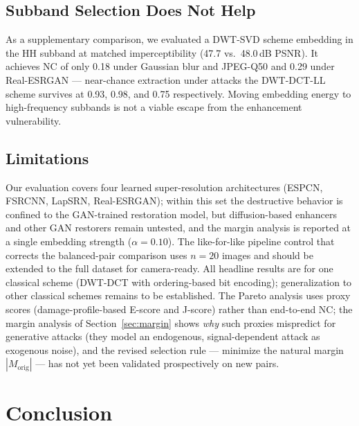 \documentclass[conference]{IEEEtran}
\begin{document}
\subsection{Subband Selection Does Not Help}
As a supplementary comparison, we evaluated a DWT-SVD scheme embedding
in the HH subband at matched imperceptibility (47.7 vs.\ 48.0\,dB
PSNR). It achieves NC of only 0.18 under Gaussian blur and JPEG-Q50 and
0.29 under Real-ESRGAN --- near-chance extraction under attacks
the DWT-DCT-LL scheme survives at 0.93, 0.98, and 0.75 respectively.
Moving embedding energy to high-frequency subbands is not a viable
escape from the enhancement vulnerability.

\subsection{Limitations}
Our evaluation covers four learned super-resolution architectures
(ESPCN, FSRCNN, LapSRN, Real-ESRGAN); within this set the destructive
behavior is confined to the GAN-trained restoration model, but
diffusion-based enhancers and other GAN restorers remain untested, and
the margin analysis is reported at a single embedding strength
($\alpha=0.10$). The like-for-like pipeline control that corrects the
balanced-pair comparison uses $n=20$ images and should be extended to
the full dataset for camera-ready. All headline results are for one
classical scheme (DWT-DCT with ordering-based bit encoding);
generalization to other classical schemes remains to be established.
The Pareto analysis uses proxy scores (damage-profile-based E-score and
J-score) rather than end-to-end NC; the margin analysis of
Section~\ref{sec:margin} shows \emph{why} such proxies mispredict for
generative attacks (they model an endogenous, signal-dependent attack
as exogenous noise), and the revised selection rule --- minimize the
natural margin $|M_{\mathrm{orig}}|$ --- has not yet been validated
prospectively on new pairs.

\section{Conclusion}
\label{sec:conclusion}
\end{document}
